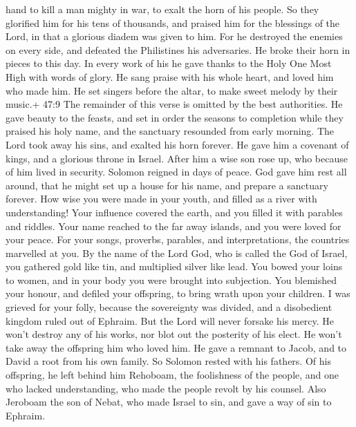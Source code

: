 hand to kill a man mighty in war, to exalt the horn of his people.
 So they glorified him for his tens of thousands, and
praised him for the blessings of the Lord, in that a glorious diadem was
given to him.  For he destroyed the enemies on every side,
and defeated the Philistines his adversaries. He broke their horn in
pieces to this day.  In every work of his he gave thanks to
the Holy One Most High with words of glory. He sang praise with his
whole heart, and loved him who made him.  He set singers
before the altar, to make sweet melody by their music.+ 47:9 The
remainder of this verse is omitted by the best authorities.
 He gave beauty to the feasts, and set in order the seasons
to completion while they praised his holy name, and the sanctuary
resounded from early morning.  The Lord took away his sins,
and exalted his horn forever. He gave him a covenant of kings, and a
glorious throne in Israel.  After him a wise son rose up,
who because of him lived in security.  Solomon reigned in
days of peace. God gave him rest all around, that he might set up a
house for his name, and prepare a sanctuary forever.  How
wise you were made in your youth, and filled as a river with
understanding!  Your influence covered the earth, and you
filled it with parables and riddles.  Your name reached to
the far away islands, and you were loved for your peace. 
For your songs, proverbs, parables, and interpretations, the countries
marvelled at you.  By the name of the Lord God, who is
called the God of Israel, you gathered gold like tin, and multiplied
silver like lead.  You bowed your loins to women, and in
your body you were brought into subjection.  You blemished
your honour, and defiled your offspring, to bring wrath upon your
children. I was grieved for your folly,  because the
sovereignty was divided, and a disobedient kingdom ruled out of Ephraim.
 But the Lord will never forsake his mercy. He won't
destroy any of his works, nor blot out the posterity of his elect. He
won't take away the offspring him who loved him. He gave a remnant to
Jacob, and to David a root from his own family.  So Solomon
rested with his fathers. Of his offspring, he left behind him Rehoboam,
the foolishness of the people, and one who lacked understanding, who
made the people revolt by his counsel. Also Jeroboam the son of Nebat,
who made Israel to sin, and gave a way of sin to Ephraim. 
